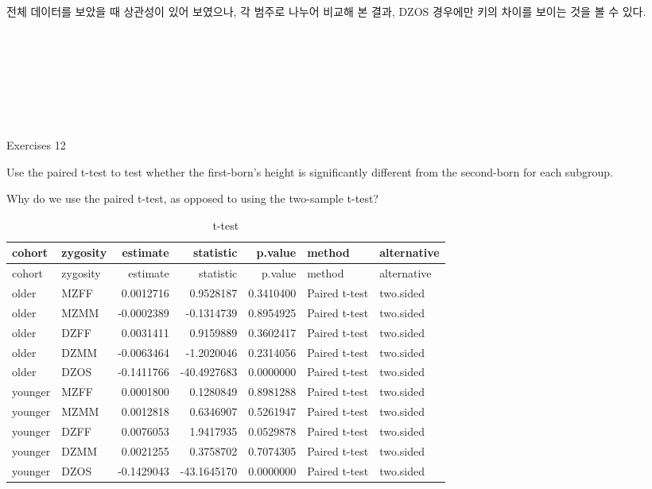 \documentclass[]{article}
\newenvironment{Shaded}{\begin{snugshade}}{\end{snugshade}}
\newcommand{\KeywordTok}[1]{\textcolor[rgb]{0.13,0.29,0.53}{\textbf{#1}}}
\newcommand{\DataTypeTok}[1]{\textcolor[rgb]{0.13,0.29,0.53}{#1}}
\newcommand{\DecValTok}[1]{\textcolor[rgb]{0.00,0.00,0.81}{#1}}
\newcommand{\StringTok}[1]{\textcolor[rgb]{0.31,0.60,0.02}{#1}}
\newcommand{\OtherTok}[1]{\textcolor[rgb]{0.56,0.35,0.01}{#1}}
\newcommand{\OperatorTok}[1]{\textcolor[rgb]{0.81,0.36,0.00}{\textbf{#1}}}
\newcommand{\NormalTok}[1]{#1}
\begin{document}
전체 데이터를 보았을 때 상관성이 있어 보였으나, 각 범주로 나누어 비교해
본 결과, DZOS 경우에만 키의 차이를 보이는 것을 볼 수 있다.

~

~

~

~

Exercises 12

Use the paired t-test to test whether the first-born's height is
significantly different from the second-born for each subgroup.

Why do we use the paired t-test, as opposed to using the two-sample
t-test?

\begin{Shaded}
\end{Shaded}

\begin{longtable}[]{@{}llrrrll@{}}
\caption{t-test}\tabularnewline
\toprule
cohort & zygosity & estimate & statistic & p.value & method &
alternative\tabularnewline
\midrule
\endfirsthead
\toprule
cohort & zygosity & estimate & statistic & p.value & method &
alternative\tabularnewline
\midrule
\endhead
older & MZFF & 0.0012716 & 0.9528187 & 0.3410400 & Paired t-test &
two.sided\tabularnewline
older & MZMM & -0.0002389 & -0.1314739 & 0.8954925 & Paired t-test &
two.sided\tabularnewline
older & DZFF & 0.0031411 & 0.9159889 & 0.3602417 & Paired t-test &
two.sided\tabularnewline
older & DZMM & -0.0063464 & -1.2020046 & 0.2314056 & Paired t-test &
two.sided\tabularnewline
older & DZOS & -0.1411766 & -40.4927683 & 0.0000000 & Paired t-test &
two.sided\tabularnewline
younger & MZFF & 0.0001800 & 0.1280849 & 0.8981288 & Paired t-test &
two.sided\tabularnewline
younger & MZMM & 0.0012818 & 0.6346907 & 0.5261947 & Paired t-test &
two.sided\tabularnewline
younger & DZFF & 0.0076053 & 1.9417935 & 0.0529878 & Paired t-test &
two.sided\tabularnewline
younger & DZMM & 0.0021255 & 0.3758702 & 0.7074305 & Paired t-test &
two.sided\tabularnewline
younger & DZOS & -0.1429043 & -43.1645170 & 0.0000000 & Paired t-test &
two.sided\tabularnewline
\bottomrule
\end{longtable}
\end{document}
